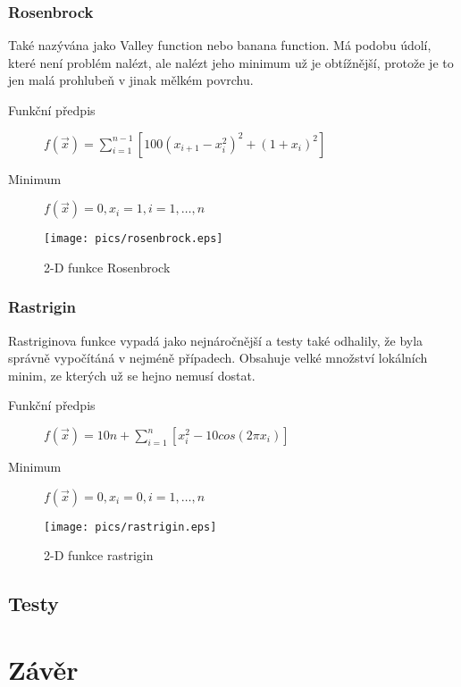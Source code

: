 \documentclass[12pt,a4paper,fleqn]{article}
\begin{document}
\subsubsection*{Rosenbrock}
Také nazývána jako Valley function nebo banana function. Má podobu údolí, které není problém nalézt, ale nalézt jeho minimum už je obtížnější, protože je to jen malá prohlubeň v jinak mělkém povrchu.
\begin{description}
\item[Funkční předpis] $f(\vec{x}) = \sum\limits_{i=1}^{n-1} [100(x_{i+1} - x_i^2)^2 + (1 + x_i)^2]$
\item[Minimum] $f(\vec{x}) = 0, x_i = 1, i = 1,\dots,n$
\end{description}
\begin{figure*}[h]
\centering
\texttt{[image: pics/rosenbrock.eps]}
\caption{2-D funkce Rosenbrock}
\end{figure*}

\subsubsection*{Rastrigin}
Rastriginova funkce vypadá jako nejnáročnější a testy také odhalily, že byla správně vypočítáná v nejméně případech. Obsahuje velké množství lokálních minim, ze kterých už se hejno nemusí dostat.

\begin{description}
\item[Funkční předpis] $f(\vec{x}) = 10n + \sum\limits_{i=1}^n [x_i^2 - 10 cos (2 \pi x_i)]$
\item[Minimum] $f(\vec{x}) = 0, x_i = 0, i = 1,\dots,n$
\end{description}

\begin{figure*}[h]
\centering
\texttt{[image: pics/rastrigin.eps]}
\caption{2-D funkce rastrigin}
\end{figure*}

\subsection{Testy}
\blindtext

\section{Závěr} \label{zaver}
\blindtext


  \begin{flushleft}
  \end{flushleft}
\end{document}
